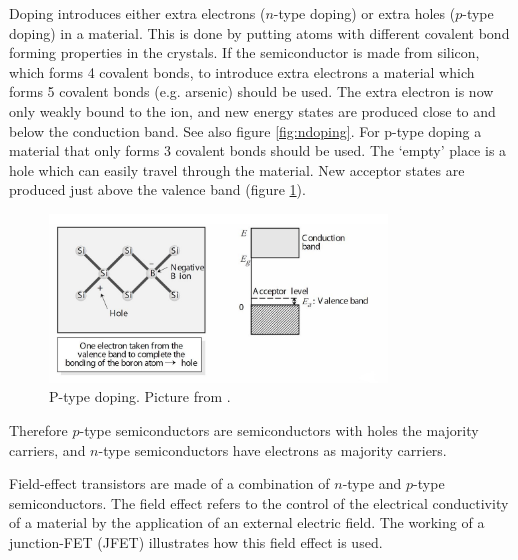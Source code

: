 Doping introduces either extra electrons ($n$-type doping) or extra holes ($p$-type doping) in a material. This is done by putting atoms with different covalent bond forming properties in the crystals. If the semiconductor is made from silicon, which forms 4 covalent bonds, to introduce extra electrons a material which forms 5 covalent bonds (e.g. arsenic) should be used. The extra electron is now only weakly bound to the ion, and new energy states are produced close to and below the conduction band. See also figure \ref{fig:ndoping}. For p-type doping a material that only forms 3 covalent bonds should be used. The `empty' place is a hole which can easily travel through the material. New acceptor states are produced just above the valence band (figure \ref{fig:pdoping}).\citep{vanweesbook} %

\begin{figure}[!ht]
 \begin{center}
  \includegraphics[width=0.8\textwidth]{pdoping}
  \caption{P-type doping. Picture from \citet{vanweesbook}.}
  \label{fig:pdoping}
 \end{center}
\end{figure}

Therefore $p$-type semiconductors are semiconductors with holes the majority carriers, and $n$-type semiconductors have electrons as majority carriers.

Field-effect transistors are made of a combination of $n$-type and $p$-type semiconductors. The field effect refers to the control of the electrical conductivity of a material by the application of an external electric field. The working of a junction-FET (JFET) illustrates how this field effect is used.

